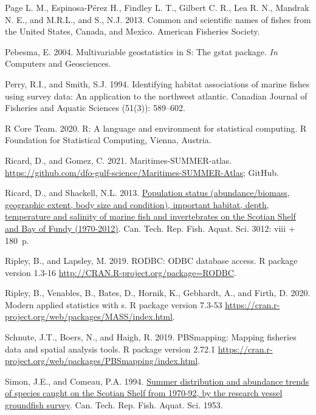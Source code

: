 \documentclass[12pt]{article}\usepackage[]{graphicx}\usepackage[]{color}
\begin{document}
\begin{CSLReferences}{1}{0}
\leavevmode\hypertarget{ref-page:etal:7thedition}{}%
Page L. M., Espinosa-Pérez H., Findley L. T., Gilbert C. R., Lea R. N., Mandrak N. E., and M.R.L., and S., N.J. 2013. Common and scientific names of fishes from the {U}nited {S}tates, {C}anada, and {M}exico. American Fisheries Society.

\leavevmode\hypertarget{ref-R:package:gstat}{}%
Pebesma, E. 2004. Multivariable geostatistics in {S}: The gstat package. \emph{In} Computers and Geosciences.

\leavevmode\hypertarget{ref-Perry:Smith:1994:cjfas}{}%
Perry, R.I., and Smith, S.J. 1994. Identifying habitat associations of marine fishes using survey data: An application to the northwest atlantic. Canadian Journal of Fisheries and Aquatic Sciences (51(3)): 589--602.

\leavevmode\hypertarget{ref-R:2020}{}%
R Core Team. 2020. R: A language and environment for statistical computing. R Foundation for Statistical Computing, Vienna, Austria.

\leavevmode\hypertarget{ref-Ricard-Gomez-2021}{}%
Ricard, D., and Gomez, C. 2021. Maritimes-SUMMER-atlas. \url{https://github.com/dfo-gulf-science/Maritimes-SUMMER-Atlas}; GitHub.

\leavevmode\hypertarget{ref-Ricard:MARatlas:2013}{}%
Ricard, D., and Shackell, N.L. 2013. \href{http://publications.gc.ca/site/eng/9.589947/publication.html}{Population status (abundance/biomass, geographic extent, body size and condition), important habitat, depth, temperature and salinity of marine fish and invertebrates on the {S}cotian {S}helf and {B}ay of {F}undy (1970-2012)}. Can. Tech. Rep. Fish. Aquat. Sci. 3012: viii + 180~p.

\leavevmode\hypertarget{ref-R:package:RODBC}{}%
Ripley, B., and Lapsley, M. 2019. RODBC: ODBC database access. R package version 1.3-16 \url{http://CRAN.R-project.org/package=RODBC}.

\leavevmode\hypertarget{ref-R:package:MASS}{}%
Ripley, B., Venables, B., Bates, D., Hornik, K., Gebhardt, A., and Firth, D. 2020. Modern applied statistics with s. R package version 7.3-53 \url{https://cran.r-project.org/web/packages/MASS/index.html}.

\leavevmode\hypertarget{ref-R:package:PBSmapping}{}%
Schnute, J.T., Boers, N., and Haigh, R. 2019. PBSmapping: Mapping fisheries data and spatial analysis tools. R package version 2.72.1 \url{https://cran.r-project.org/web/packages/PBSmapping/index.html}.

\leavevmode\hypertarget{ref-Simon:Comeau:1994}{}%
Simon, J.E., and Comeau, P.A. 1994. \href{http://publications.gc.ca/site/eng/46517/publication.html}{Summer distribution and abundance trends of species caught on the {S}cotian {S}helf from 1970-92, by the research vessel groundfish survey}. Can. Tech. Rep. Fish. Aquat. Sci. 1953.


\end{CSLReferences}
\end{document}
